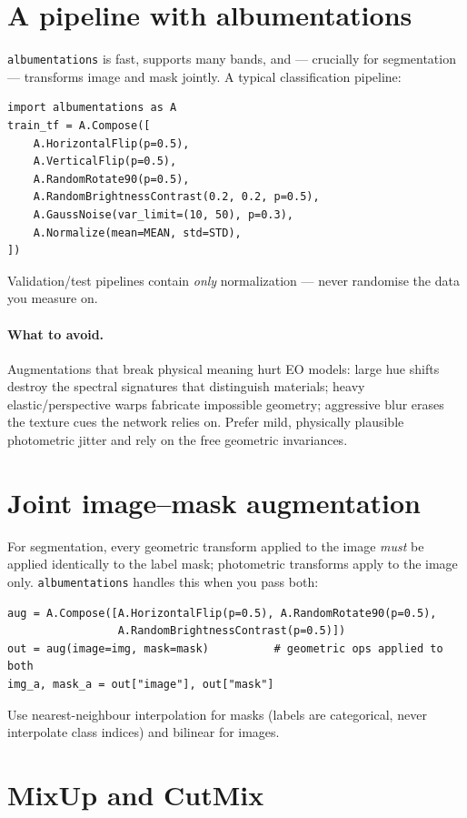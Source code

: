 \section{A pipeline with albumentations}

\texttt{albumentations} is fast, supports many bands, and --- crucially for
segmentation --- transforms image and mask jointly. A typical classification
pipeline:
\begin{lstlisting}
import albumentations as A
train_tf = A.Compose([
    A.HorizontalFlip(p=0.5),
    A.VerticalFlip(p=0.5),
    A.RandomRotate90(p=0.5),
    A.RandomBrightnessContrast(0.2, 0.2, p=0.5),
    A.GaussNoise(var_limit=(10, 50), p=0.3),
    A.Normalize(mean=MEAN, std=STD),
])
\end{lstlisting}
Validation/test pipelines contain \emph{only} normalization --- never randomise
the data you measure on.

\paragraph{What to avoid.} Augmentations that break physical meaning hurt EO
models: large hue shifts destroy the spectral signatures that distinguish
materials; heavy elastic/perspective warps fabricate impossible geometry;
aggressive blur erases the texture cues the network relies on. Prefer mild,
physically plausible photometric jitter and rely on the free geometric
invariances.

\section{Joint image--mask augmentation}

For segmentation, every geometric transform applied to the image \emph{must} be
applied identically to the label mask; photometric transforms apply to the image
only. \texttt{albumentations} handles this when you pass both:
\begin{lstlisting}
aug = A.Compose([A.HorizontalFlip(p=0.5), A.RandomRotate90(p=0.5),
                 A.RandomBrightnessContrast(p=0.5)])
out = aug(image=img, mask=mask)          # geometric ops applied to both
img_a, mask_a = out["image"], out["mask"]
\end{lstlisting}
Use nearest-neighbour interpolation for masks (labels are categorical, never
interpolate class indices) and bilinear for images.

\section{MixUp and CutMix}

